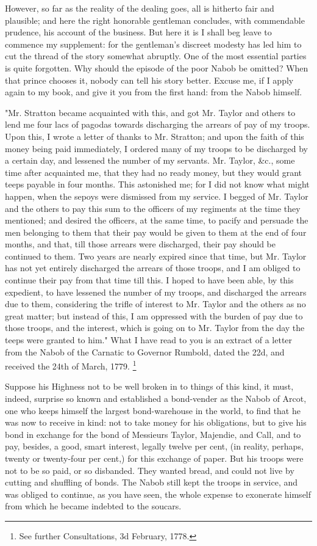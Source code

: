 However, so far as the reality of the dealing goes, all is hitherto fair and plausible; and here the right honorable gentleman concludes, with commendable prudence, his account of the business. But here it is I shall beg leave to commence my supplement: for the gentleman's discreet modesty has led him to cut the thread of the story somewhat abruptly. One of the most essential parties is quite forgotten. Why should the episode of the poor Nabob be omitted? When that prince chooses it, nobody can tell his story better. Excuse me, if I apply again to my book, and give it you from the first hand: from the Nabob himself.

"Mr. Stratton became acquainted with this, and got Mr. Taylor and others to lend me four lacs of pagodas towards discharging the arrears of pay of my troops. Upon this, I wrote a letter of thanks to Mr. Stratton; and upon the faith of this money being paid immediately, I ordered many of my troops to be discharged by a certain day, and lessened the number of my servants. Mr. Taylor, \&c., some time after acquainted me, that they had no ready money, but they would grant teeps payable in four months. This astonished me; for I did not know what might happen, when the sepoys were dismissed from my service. I begged of Mr. Taylor and the others to pay this sum to the officers of my regiments at the time they mentioned; and desired the officers, at the same time, to pacify and persuade the men belonging to them that their pay would be given to them at the end of four months, and that, till those arrears were discharged, their pay should be continued to them. Two years are nearly expired since that time, but Mr. Taylor has not yet entirely discharged the arrears of those troops, and I am obliged to continue their pay from that time till this. I hoped to have been able, by this expedient, to have lessened the number of my troops, and discharged the arrears due to them, considering the trifle of interest to Mr. Taylor and the others as no great matter; but instead of this, I am oppressed with the burden of pay due to those troops, and the interest, which is going on to Mr. Taylor from the day the teeps were granted to him." What I have read to you is an extract of a letter from the Nabob of the Carnatic to Governor Rumbold, dated the 22d, and received the 24th of March, 1779.
\footnote{ See further Consultations, 3d February, 1778.}


Suppose his Highness not to be well broken in to things of this kind, it must, indeed, surprise so known and established a bond-vender as the Nabob of Arcot, one who keeps himself the largest bond-warehouse in the world, to find that he was now to receive in kind: not to take money for his obligations, but to give his bond in exchange for the bond of Messieurs Taylor, Majendie, and Call, and to pay, besides, a good, smart interest, legally twelve per cent, (in reality, perhaps, twenty or twenty-four per cent,) for this exchange of paper. But his troops were not to be so paid, or so disbanded. They wanted bread, and could not live by cutting and shuffling of bonds. The Nabob still kept the troops in service, and was obliged to continue, as you have seen, the whole expense to exonerate himself from which he became indebted to the soucars.

